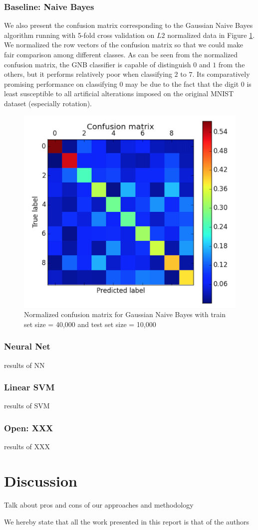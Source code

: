 \documentclass{acm_proc_article-sp}
\begin{document}
\subsubsection{Baseline: Naive Bayes}
We also present the confusion matrix corresponding to the Gaussian Naive Bayes algorithm running with 5-fold cross validation on $L2$ normalized data in Figure \ref{fig:gnb_cm}. We normalized the row vectors of the confusion matrix so that we could make fair comparison among different classes. As can be seen from the normalized confusion matrix, the GNB classifier is capable of distinguish $0$ and $1$ from the others, but it performs relatively poor when classifying $2$ to $7$. Its comparatively promising performance on classifying $0$ may be due to the fact that the digit $0$ is least susceptible to all artificial alterations imposed on the original MNIST dataset (especially rotation).
\begin{figure} 
\centering
\includegraphics[width=0.9\columnwidth]{graphs/gnb_cm1.png}  
\caption{Normalized confusion matrix for Gaussian Naive Bayes with train set size = 40,000 and test set size = 10,000}
\label{fig:gnb_cm}
\end{figure}


\subsubsection{Neural Net}
results of NN

\subsubsection{Linear SVM }
results of SVM

\subsubsection{Open: XXX}
results of XXX 



\section{Discussion}
Talk about pros and cons	of	our	approaches and	methodology


We	hereby	state	that	all	the	work	 presented	in	this	report	is	that	of	the	authors

  
\end{document}
